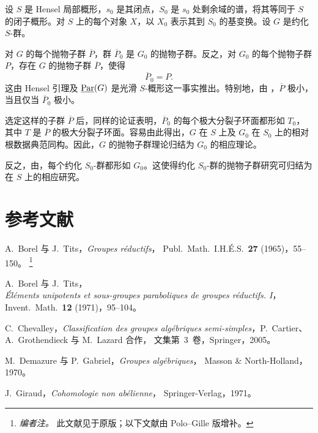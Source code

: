 
设 \(S\) 是 Hensel 局部概形，\(s_0\) 是其闭点，\(S_0\) 是 \(s_0\) 处剩余域的谱，将其等同于 \(S\) 的闭子概形。对 \(S\) 上的每个对象 \(X\)，以 \(X_0\) 表示其到 \(S_0\) 的基变换。设 \(G\) 是约化 \(S\)-群。

对 \(G\) 的每个抛物子群 \(\overline P\)，群 \(\overline P_0\) 是 \(G_0\) 的抛物子群。反之，对 \(G_0\) 的每个抛物子群 \(P\)，存在 \(G\) 的抛物子群 \(\overline P\)，使得
\[
 \overline P_0=P.
\]
这由 Hensel 引理及 \(\underline{\operatorname{Par}}(G)\) 是光滑 \(S\)-概形这一事实推出。特别地，由 ，\(\overline P\) 极小，当且仅当 \(\overline P_0\) 极小。

选定这样的子群 \(\overline P\) 后，同样的论证表明，\(\overline P_0\) 的每个极大分裂子环面都形如 \(T_0\)，其中 \(T\) 是 \(\overline P\) 的极大分裂子环面。容易由此得出，\(G\) 在 \(S\) 上及 \(G_0\) 在 \(S_0\) 上的相对根数据典范同构。因此，\(G\) 的抛物子群理论归结为 \(G_0\) 的相应理论。

反之，由，每个约化 \(S_0\)-群都形如 \(G_0\)。这使得约化 \(S_0\)-群的抛物子群研究可归结为在 \(S\) 上的相应研究。

\chapter*{参考文献}

\begin{description}[leftmargin=4.5em,style=nextline]
\item[\textup{[BT65]}]
A.~Borel 与 J.~Tits，\emph{Groupes réductifs}，
Publ.\ Math.\ I.H.É.S.\ \textbf{27} \textup{(1965)}，55--150。
\footnote{\emph{编者注。} 此文献见于原版；以下文献由 Polo--Gille 版增补。}

\item[\textup{[BT71]}]
A.~Borel 与 J.~Tits，\\
\emph{Éléments unipotents et sous-groupes
paraboliques de groupes réductifs. I}，
Invent.\ Math.\ \textbf{12} \textup{(1971)}，95--104。

\item[\textup{[Ch05]}]
C.~Chevalley，\emph{Classification des groupes algébriques
semi-simples}，P.~Cartier、A.~Grothendieck 与 M.~Lazard 合作，
文集第~3~卷，Springer，2005。

\item[\textup{[DG70]}]
M.~Demazure 与 P.~Gabriel，\emph{Groupes algébriques}，
Masson \& North-Holland，1970。

\item[\textup{[Gi71]}]
J.~Giraud，\emph{Cohomologie non abélienne}，
Springer-Verlag，1971。
\end{description}

